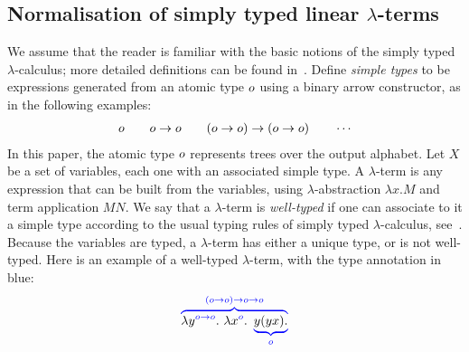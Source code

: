 \subsection{Normalisation of simply typed linear $\lambda$-terms}
\label{sec:one-register}




We assume that the reader is familiar with the basic notions of the simply typed $\lambda$-calculus; more detailed definitions can be found in~\cite{sorensen_lectures_2006}. 
Define  \emph{simple types} to be expressions  generated from an atomic type $o$ using a binary arrow constructor, as in the following examples:
\begin{align*}
    o \qquad o \to o \qquad (o \to o) \to (o \to o) \qquad \cdots 
\end{align*}
In this paper,  the atomic type $o$ represents trees over the output alphabet.
Let $X$ be a set of variables, each one with an associated simple type.  A $\lambda$-term  is any expression that can be built from the variables, using $\lambda$-abstraction $\lambda x. M$ and term application $M N$. 
We say that a $\lambda$-term is \emph{well-typed} if one can associate  to it  a simple type according to the usual typing rules of simply typed $\lambda$-calculus,
see~\cite[Definition 3.2.1]{sorensen_lectures_2006}. Because the variables are typed, a  $\lambda$-term has  either a unique type, or is not well-typed.  Here is an example of a well-typed $\lambda$-term, with the type annotation in blue: 
\begin{align*}
    {\color{blue}\overbrace{
        {\color{black}\lambda {y}^{{\color{blue}o\to o}}. \ \lambda {x}^{{\color{blue}o}}.}  \ \underbrace{{\color{black}y (y x).}}_{o}}^{(o\to o) \to o\to o}}
    \end{align*}

    

